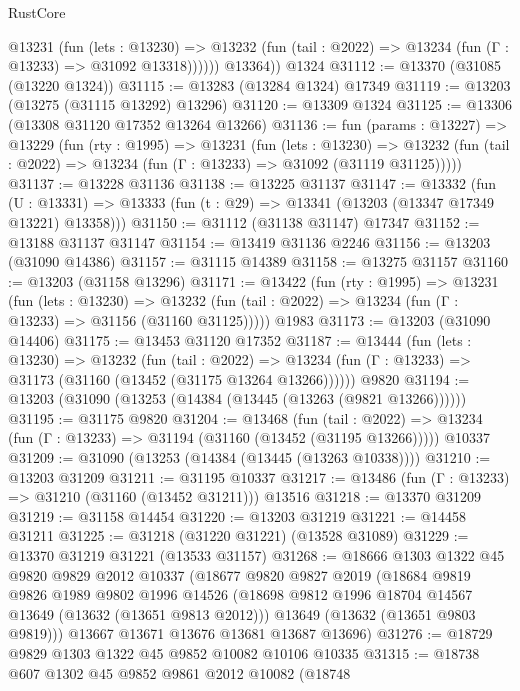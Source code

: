 \begin{lexlean}{RustCore}
\begin{coremodule}
            @13231
              (fun (lets : @13230) =>
              @13232 (fun (tail : @2022) => @13234 (fun (Γ : @13233) => @31092 @13318))))))
        @13364))
    @1324
@31112 := @13370 (@31085 (@13220 @1324))
@31115 := @13283 (@13284 @1324) @17349
@31119 := @13203 (@13275 (@31115 @13292) @13296)
@31120 := @13309 @1324
@31125 := @13306 (@13308 @31120 @17352 @13264 @13266)
@31136 := fun (params : @13227) =>
  @13229
    (fun (rty : @1995) =>
    @13231
      (fun (lets : @13230) =>
      @13232 (fun (tail : @2022) => @13234 (fun (Γ : @13233) => @31092 (@31119 @31125)))))
@31137 := @13228 @31136
@31138 := @13225 @31137
@31147 := @13332
    (fun (U : @13331) => @13333 (fun (t : @29) => @13341 (@13203 (@13347 @17349 @13221) @13358)))
@31150 := @31112 (@31138 @31147) @17347
@31152 := @13188 @31137 @31147
@31154 := @13419 @31136 @2246
@31156 := @13203 (@31090 @14386)
@31157 := @31115 @14389
@31158 := @13275 @31157
@31160 := @13203 (@31158 @13296)
@31171 := @13422
    (fun (rty : @1995) =>
    @13231
      (fun (lets : @13230) =>
      @13232 (fun (tail : @2022) => @13234 (fun (Γ : @13233) => @31156 (@31160 @31125)))))
    @1983
@31173 := @13203 (@31090 @14406)
@31175 := @13453 @31120 @17352
@31187 := @13444
    (fun (lets : @13230) =>
    @13232
      (fun (tail : @2022) =>
      @13234 (fun (Γ : @13233) => @31173 (@31160 (@13452 (@31175 @13264 @13266))))))
    @9820
@31194 := @13203 (@31090 (@13253 (@14384 (@13445 (@13263 (@9821 @13266))))))
@31195 := @31175 @9820
@31204 := @13468
    (fun (tail : @2022) => @13234 (fun (Γ : @13233) => @31194 (@31160 (@13452 (@31195 @13266)))))
    @10337
@31209 := @31090 (@13253 (@14384 (@13445 (@13263 @10338))))
@31210 := @13203 @31209
@31211 := @31195 @10337
@31217 := @13486 (fun (Γ : @13233) => @31210 (@31160 (@13452 @31211))) @13516
@31218 := @13370 @31209
@31219 := @31158 @14454
@31220 := @13203 @31219
@31221 := @14458 @31211
@31225 := @31218 (@31220 @31221) (@13528 @31089)
@31229 := @13370 @31219 @31221 (@13533 @31157)
@31268 := @18666
    @1303
    @1322
    @45
    @9820
    @9829
    @2012
    @10337
    (@18677
      @9820
      @9827
      @2019
      (@18684
        @9819
        @9826
        @1989
        @9802
        @1996
        @14526
        (@18698 @9812 @1996 @18704 @14567 @13649 (@13632 (@13651 @9813 @2012)))
        @13649
        (@13632 (@13651 @9803 @9819)))
      @13667
      @13671
      @13676
      @13681
      @13687
      @13696)
@31276 := @18729 @9829 @1303 @1322 @45 @9852 @10082 @10106 @10335
@31315 := @18738
    @607
    @1302
    @45
    @9852
    @9861
    @2012
    @10082
    (@18748

\end{coremodule}
\end{lexlean}

